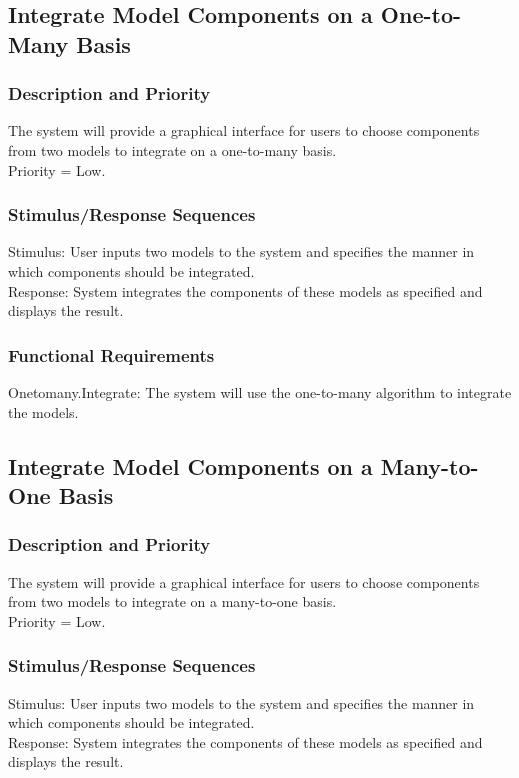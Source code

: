 \documentclass{article}
\begin{document}
\subsection{Integrate Model Components on a One-to-Many Basis}
\subsubsection{Description and Priority}
The system will provide a graphical interface for users to choose components from two models to integrate on a one-to-many basis.\\
Priority = Low.

\subsubsection{Stimulus/Response Sequences}
Stimulus: User inputs two models to the system and specifies the manner in which components should be integrated.\\
Response: System integrates the components of these models as specified and displays the result.

\subsubsection{Functional Requirements}
Onetomany.Integrate: The system will use the one-to-many algorithm to integrate the models.

\subsection{Integrate Model Components on a Many-to-One Basis}
\subsubsection{Description and Priority}
The system will provide a graphical interface for users to choose components from two models to integrate on a many-to-one basis.\\
Priority = Low.

\subsubsection{Stimulus/Response Sequences}
Stimulus: User inputs two models to the system and specifies the manner in which components should be integrated.\\
Response: System integrates the components of these models as specified and displays the result.
\end{document}
